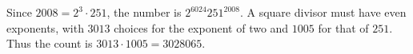 Since $2008=2^3\cdot251$, the number is $2^{6024}251^{2008}$. A square divisor must have even exponents, with $3013$ choices for the exponent of two and $1005$ for that of $251$. Thus the count is $\boxed{3013\cdot1005=3028065}$.
